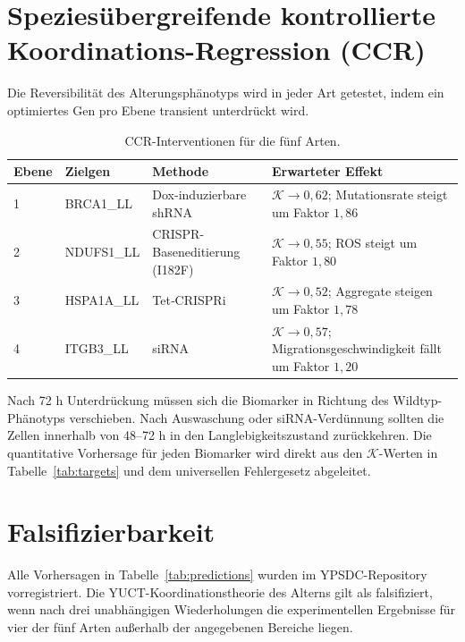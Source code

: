 \documentclass[12pt,a4paper]{article}
\newcommand{\REL}{\mathcal{K}}          %
\begin{document}
	\section{Speziesübergreifende kontrollierte Koordinations-Regression (CCR)}
	\label{sec:CCR}
	Die Reversibilität des Alterungsphänotyps wird in jeder Art getestet, indem ein optimiertes Gen pro Ebene transient unterdrückt wird.
	
	\begin{table}[H]
		\centering
		\caption{CCR-Interventionen für die fünf Arten.}
		\label{tab:CCR}
		\begin{tabular}{@{}llll@{}}
			\toprule
			\textbf{Ebene} & \textbf{Zielgen} & \textbf{Methode} & \textbf{Erwarteter Effekt} \\
			\midrule
			1 & BRCA1\_LL & Dox-induzierbare shRNA & \(\REL \to 0,62\); Mutationsrate steigt um Faktor \(1,86\) \\
			2 & NDUFS1\_LL & CRISPR-Baseneditierung (I182F) & \(\REL \to 0,55\); ROS steigt um Faktor \(1,80\) \\
			3 & HSPA1A\_LL & Tet‑CRISPRi & \(\REL \to 0,52\); Aggregate steigen um Faktor \(1,78\) \\
			4 & ITGB3\_LL & siRNA & \(\REL \to 0,57\); Migrationsgeschwindigkeit fällt um Faktor \(1,20\) \\
			\bottomrule
		\end{tabular}
	\end{table}
	
	Nach 72 h Unterdrückung müssen sich die Biomarker in Richtung des Wildtyp-Phänotyps verschieben. Nach Auswaschung oder siRNA-Verdünnung sollten die Zellen innerhalb von 48–72 h in den Langlebigkeitszustand zurückkehren. Die quantitative Vorhersage für jeden Biomarker wird direkt aus den \(\REL\)-Werten in Tabelle~\ref{tab:targets} und dem universellen Fehlergesetz abgeleitet.
	
	\section{Falsifizierbarkeit}
	\label{sec:falsifiability}
	Alle Vorhersagen in Tabelle~\ref{tab:predictions} wurden im YPSDC-Repository vorregistriert. Die YUCT-Koordinationstheorie des Alterns gilt als falsifiziert, wenn nach drei unabhängigen Wiederholungen die experimentellen Ergebnisse für vier der fünf Arten außerhalb der angegebenen Bereiche liegen.
	
\end{document}
